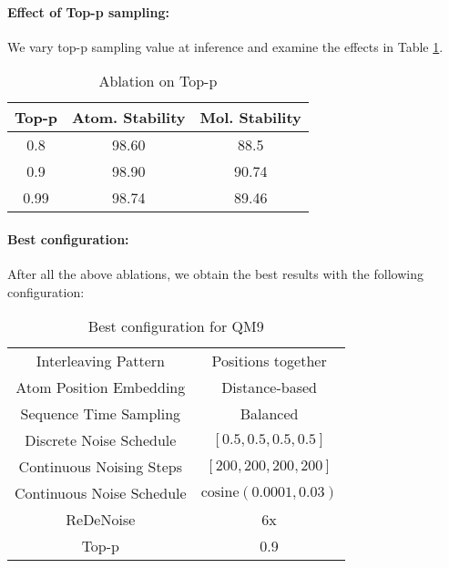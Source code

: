 \newpage
\paragraph{Effect of Top-p sampling:}
We vary top-p sampling value at inference and examine the effects in Table \ref{tab:abl_qm9_topp}.
\begin{table}[!h]
    \centering
    \begin{tabular}{c c c}
    \toprule
 Top-p & Atom. Stability & Mol. Stability \\
  \midrule
  0.8  &  98.60 &  88.5 \\
  0.9  & 98.90 & 90.74 \\
  0.99  & 98.74 & 89.46\\
  \bottomrule
\end{tabular}
    \caption{Ablation on Top-p}
    \label{tab:abl_qm9_topp}
\end{table}


\paragraph{Best configuration:} After all the above ablations, we obtain the best results with the following configuration:

\begin{table}[!h]
    \centering
    \begin{tabular}{c c}
    \toprule
   Interleaving Pattern  & Positions together  \\
   Atom Position Embedding  & Distance-based \\
   Sequence Time Sampling & Balanced \\
   Discrete Noise Schedule & $[0.5, 0.5, 0.5, 0.5]$ \\
   Continuous Noising Steps & $[200, 200, 200, 200]$ \\
   Continuous Noise Schedule &$\text{cosine}(0.0001, 0.03)$  \\
   ReDeNoise & 6x  \\
   Top-p & 0.9\\
   \bottomrule
\end{tabular}
    \caption{Best configuration for QM9}
    \label{app:tab:mol_config_best}
\end{table}
